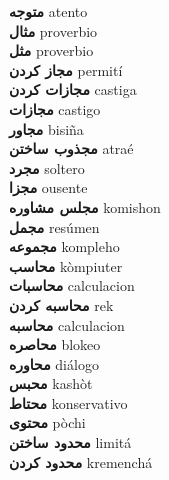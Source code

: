 \textbf{ متوجه  } atento \\
\textbf{ مثال  } proverbio \\
\textbf{ مثل  } proverbio \\
\textbf{ مجاز کردن  } permití \\
\textbf{ مجازات کردن  } castiga \\
\textbf{ مجازات  } castigo \\
\textbf{ مجاور  } bisiña \\
\textbf{ مجذوب ساختن  } atraé \\
\textbf{ مجرد  } soltero \\
\textbf{ مجزا  } ousente \\
\textbf{ مجلس مشاوره  } komishon \\
\textbf{ مجمل  } resúmen \\
\textbf{ مجموعه  } kompleho \\
\textbf{ محاسب  } kòmpiuter \\
\textbf{ محاسبات  } calculacion \\
\textbf{ محاسبه کردن  } rek \\
\textbf{ محاسبه  } calculacion \\
\textbf{ محاصره  } blokeo \\
\textbf{ محاوره  } diálogo \\
\textbf{ محبس  } kashòt \\
\textbf{ محتاط  } konservativo \\
\textbf{ محتوی  } pòchi \\
\textbf{ محدود ساختن  } limitá \\
\textbf{ محدود کردن  } kremenchá \\
